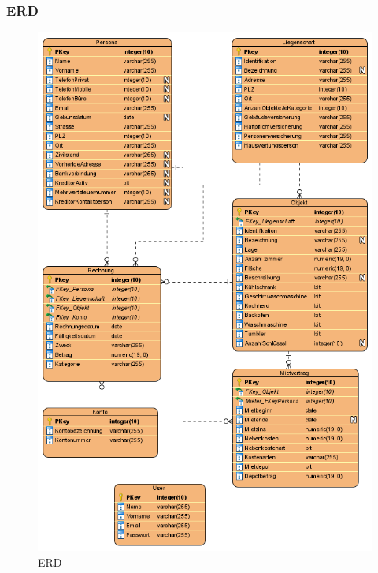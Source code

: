 \subsubsection{ERD}
\begin{figure}[H]
  \begin{center}
    \includegraphics[height=0.85\textheight]{content/diagrams/out/erd/erd.png}
    \caption{ERD}
    \label{ERD}
  \end{center}
\end{figure}

